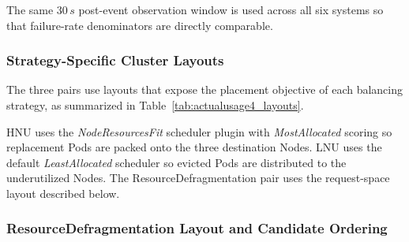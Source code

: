 The same \(30\,s\) post-event observation window is used across all six systems so that failure-rate denominators are directly comparable.

\subsubsection{Strategy-Specific Cluster Layouts}
\label{subsubsec:actualusage4_layouts}

The three pairs use layouts that expose the placement objective of each balancing strategy, as summarized in Table~\ref{tab:actualusage4_layouts}.

\begin{table}[H]
    \centering
    \caption{Strategy-Specific Layouts for Actual Usage Evaluation}
    \label{tab:actualusage4_layouts}
    \renewcommand{\arraystretch}{1.2}
\end{table}

HNU uses the \textit{NodeResourcesFit} scheduler plugin with \textit{MostAllocated} scoring so replacement Pods are packed onto the three destination Nodes. LNU uses the default \textit{LeastAllocated} scheduler so evicted Pods are distributed to the underutilized Nodes. The ResourceDefragmentation pair uses the request-space layout described below.

\subsubsection{ResourceDefragmentation Layout and Candidate Ordering}
\label{subsubsec:actualusage4_candidateordering}

